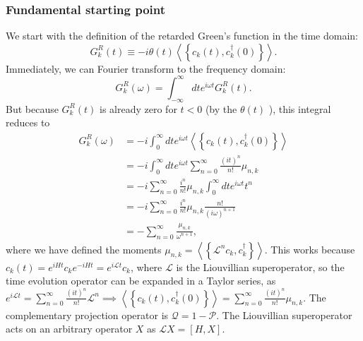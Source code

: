 \subsubsection{Fundamental starting point}
We start with the definition of the retarded Green's function in the time domain:
\begin{equation}
G_k^R(t) \equiv -i \theta(t)\left\langle\left\{c_k(t), c_k^{\dagger}(0)\right\}\right\rangle .
\end{equation}
Immediately, we can Fourier transform to the frequency domain:
\begin{equation}
G_k^R(\omega)=\int_{-\infty}^{\infty} d t e^{i \omega t} G_k^R(t) .
\end{equation}
But because $G_k^R(t)$ is already zero for $t<0$ (by the $\theta(t)$ ), this integral reduces to
\begin{align}
G_k^R(\omega)&=-i \int_0^{\infty} d t e^{i \omega t}\left\langle\left\{c_k(t), c_k^{\dagger}(0)\right\}\right\rangle \\
&=-i \int_0^{\infty} d t e^{i \omega t} \sum_{n=0}^{\infty} \frac{(i t)^n}{n!}\mu_{n,k} \\
&=-i \sum_{n=0}^{\infty} \frac{i^n}{n!}\mu_{n,k} \int_0^{\infty} d t e^{i \omega t}t^n \\
&=-i \sum_{n=0}^{\infty} \frac{i^n}{n!}\mu_{n,k} \frac{n!}{(i \omega)^{n+1}} \\
&=-\sum_{n=0}^{\infty} \frac{\mu_{n,k}}{\omega^{n+1}} ,
\end{align}
where we have defined the moments $\mu_{n,k}=\left\langle\left\{\mathcal{L}^n c_k, c_k^{\dagger}\right\}\right\rangle$. This works because $c_k(t)=e^{i H t} c_k e^{-i H t} = e^{i \mathcal{L} t} c_k$, where $\mathcal{L}$ is the Liouvillian superoperator, so the time evolution operator can be expanded in a Taylor series, as $e^{i \mathcal{L} t}=\sum_{n=0}^{\infty} \frac{(i t)^n}{n!} \mathcal{L}^n \implies \left\langle\left\{c_k(t), c_k^{\dagger}(0)\right\}\right\rangle  = \sum_{n=0}^{\infty} \frac{(i t)^n}{n!}\mu_{n,k}$. The complementary projection operator is $\mathcal{Q} = 1 - \mathcal{P}$. The Liouvillian superoperator acts on an arbitrary operator $X$ as $\mathcal{L} X = [H,X]$.
